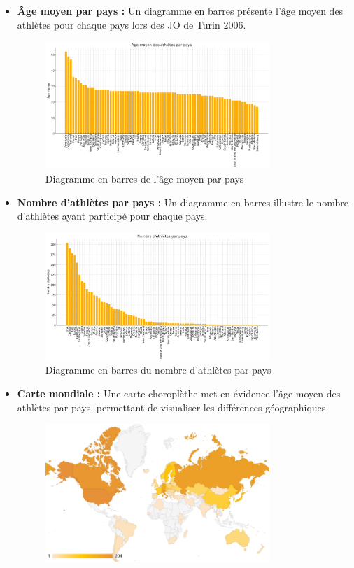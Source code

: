\documentclass[fontsize=10pt,oneside]{scrreprt}
\begin{document}
\begin{itemize}
    \item \textbf{Âge moyen par pays :} Un diagramme en barres présente l'âge moyen des athlètes pour chaque pays lors des JO de Turin 2006.
    \begin{figure}[H]
        \centering
        \includegraphics[width=0.8\textwidth]{charts/agemoyenparpays.png}
        \caption{Diagramme en barres de l'âge moyen par pays}
        \label{fig:age_moyen_pays}
    \end{figure}
    \item \textbf{Nombre d'athlètes par pays :} Un diagramme en barres illustre le nombre d'athlètes ayant participé pour chaque pays.
    \begin{figure}[H]
        \centering
        \includegraphics[width=0.8\textwidth]{charts/nbsportifsparpays.png}
        \caption{Diagramme en barres du nombre d'athlètes par pays}
        \label{fig:nb_sportifs_pays}
    \end{figure}
    \item \textbf{Carte mondiale :} Une carte choroplèthe met en évidence l'âge moyen des athlètes par pays, permettant de visualiser les différences géographiques.
    \begin{figure}[H]
        \centering
        \includegraphics[width=0.8\textwidth]{charts/age_moyen_carte_real.png}

\end{figure}
\end{itemize}
\end{document}

